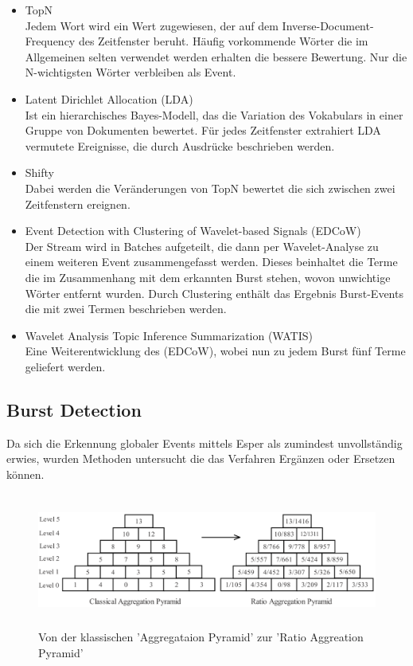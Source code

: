 \begin{itemize}
\item TopN\\Jedem Wort wird ein Wert zugewiesen, der auf dem Inverse-Document-Frequency des Zeitfenster beruht. Häufig vorkommende Wörter die im Allgemeinen selten verwendet werden erhalten die bessere Bewertung. Nur die N-wichtigsten Wörter verbleiben als Event.
\item Latent Dirichlet Allocation (LDA)\\Ist ein hierarchisches Bayes-Modell, das die Variation des Vokabulars in einer Gruppe von Dokumenten bewertet. Für jedes Zeitfenster extrahiert LDA  vermutete Ereignisse, die durch Ausdrücke beschrieben werden. 
\item Shifty\\Dabei werden die Veränderungen von TopN bewertet die sich zwischen zwei Zeitfenstern ereignen.
\item Event Detection with Clustering of
Wavelet-based Signals (EDCoW)\\Der Stream wird in Batches aufgeteilt, die dann per Wavelet-Analyse zu einem weiteren Event zusammengefasst werden. Dieses beinhaltet die Terme die im Zusammenhang mit dem erkannten Burst stehen, wovon unwichtige Wörter entfernt wurden. Durch Clustering enthält das Ergebnis Burst-Events die mit zwei Termen beschrieben werden.
\item Wavelet Analysis Topic Inference Summarization
(WATIS)\\ Eine Weiterentwicklung des (EDCoW), wobei nun zu jedem Burst fünf Terme geliefert werden.
\end{itemize}

\subsection{Burst Detection}
Da sich die Erkennung globaler Events mittels Esper als zumindest unvollständig erwies, wurden Methoden untersucht die das Verfahren  Ergänzen oder Ersetzen können.\\

\begin{figure}[ht]
    \centerline{\includegraphics[height=4.4cm]{images/ratiopyramid.png}}
    \caption{Von der klassischen 'Aggregataion Pyramid' zur 'Ratio Aggreation Pyramid' \cite{yuan2007online}}
    \label{fig:ratiopyramid}
\end{figure}


